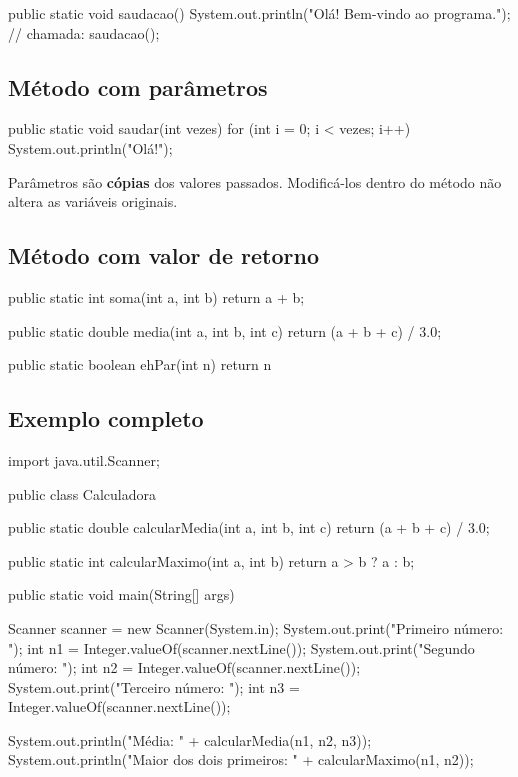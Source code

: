 \documentclass[11pt,a4paper]{article}
\begin{document}
\begin{javacode}
public static void saudacao() {
    System.out.println("Olá! Bem-vindo ao programa.");
}
// chamada:
saudacao();
\end{javacode}

\subsection{Método com parâmetros}

\begin{javacode}
public static void saudar(int vezes) {
    for (int i = 0; i < vezes; i++) {
        System.out.println("Olá!");
    }
}
\end{javacode}

\begin{destaque}[Atenção]
Parâmetros são \textbf{cópias} dos valores passados. Modificá-los dentro do método não altera as variáveis originais.
\end{destaque}

\subsection{Método com valor de retorno}

\begin{javacode}
public static int soma(int a, int b) {
    return a + b;
}

public static double media(int a, int b, int c) {
    return (a + b + c) / 3.0;
}

public static boolean ehPar(int n) {
    return n %
}
\end{javacode}

\subsection{Exemplo completo}

\begin{javacode}
import java.util.Scanner;

public class Calculadora {

    public static double calcularMedia(int a, int b, int c) {
        return (a + b + c) / 3.0;
    }

    public static int calcularMaximo(int a, int b) {
        return a > b ? a : b;
    }

    public static void main(String[] args) {
        Scanner scanner = new Scanner(System.in);
        System.out.print("Primeiro número: ");
        int n1 = Integer.valueOf(scanner.nextLine());
        System.out.print("Segundo número: ");
        int n2 = Integer.valueOf(scanner.nextLine());
        System.out.print("Terceiro número: ");
        int n3 = Integer.valueOf(scanner.nextLine());

        System.out.println("Média: " + calcularMedia(n1, n2, n3));
        System.out.println("Maior dos dois primeiros: " + calcularMaximo(n1, n2));
    }
}
\end{javacode}
\end{document}

